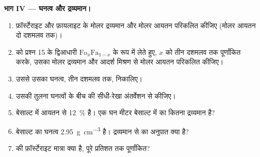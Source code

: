 \begin{problem}
\medskip
\noindent\textbf{भाग IV --- घनत्व और द्रव्यमान।}
\begin{enumerate}[resume]
  \item फ़ॉर्स्टेराइट और फ़ायलाइट के मोलर द्रव्यमान और मोलर आयतन परिकलित कीजिए (मोलर आयतन दो दशमलव तक)।
  \item {} को प्रश्न 15 के द्विआधारी $\mathrm{Fo}_x\mathrm{Fa}_{1-x}$ के रूप में लेते हुए, $x$ को तीन दशमलव तक पूर्णांकित
        करके, उसका मोलर द्रव्यमान और आदर्श मिश्रण से मोलर आयतन परिकलित कीजिए।
  \item उससे उसका घनत्व, तीन दशमलव तक, निकालिए।
  \item उसकी तुलना  घनत्वों के बीच की सीधी-रेखा अंतर्वेशन से कीजिए।
  \item बेसाल्ट में आयतन से \qty{12}{\percent}  है। एक घन मीटर बेसाल्ट में  का कितना द्रव्यमान है?
  \item बेसाल्ट का घनत्व \qty{2.95}{g.cm^{-3}} है। द्रव्यमान से  का अनुपात क्या है?
  \item {} की फ़ॉर्स्टेराइट मात्रा क्या है, पूरे प्रतिशत तक पूर्णांकित?
\end{enumerate}
\end{problem}
